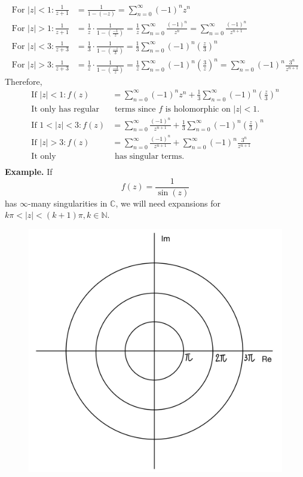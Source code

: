 \documentclass[11pt]{article}
\begin{document}
\begin{align*}
\mbox{For } |z| < 1: \frac{1}{z + 1} &= \frac{1}{1 - (-z)} = \sum_{n = 0}^{\infty} (-1)^nz^n\\
\mbox{For } |z| > 1: \frac{1}{z + 1} &= \frac{1}{z} \cdot \frac{1}{1 - \left(\frac{-1}{z}\right)} = \frac{1}{z} \sum_{n = 0}^{\infty}\frac{(-1)^n}{z^n} = \sum_{n = 0}^{\infty}\frac{(-1)^n}{z^{n + 1}}\\ 
\mbox{For } |z| < 3: \frac{1}{z + 3} &= \frac{1}{3} \cdot \frac{1}{1 - \left(\frac{-z}{3}\right)} = \frac{1}{3} \sum_{n = 0}^{\infty}(-1)^n\left(\frac{z}{3}\right)^n \\
\mbox{For } |z| > 3: \frac{1}{z + 3} &= \frac{1}{z} \cdot \frac{1}{1 - \left(\frac{-3}{z}\right)} = \frac{1}{z} \sum_{n = 0}^{\infty}(-1)^n\left(\frac{3}{z}\right)^n = \sum_{n = 0}^{\infty}(-1)^n\frac{3^n}{z^{n + 1}}
\end{align*}
Therefore, 
\begin{align*}
\mbox{If } |z| < 1: f(z) &= \sum_{n = 0}^{\infty}(-1)^nz^n + \frac{1}{3} \sum_{n = 0}^{\infty}(-1)^n\left(\frac{z}{3}\right)^n \\
\mbox{It only has regular} &\mbox{ terms since } f \mbox{ is holomorphic on } |z| < 1. \\
\mbox{If } 1 < |z| < 3: f(z) &= \sum_{n = 0}^{\infty} \frac{(-1)^n}{z^{n + 1}} + \frac{1}{3}\sum_{n = 0}^{\infty}(-1)^n\left(\frac{z}{3}\right)^n\\
\mbox{If } |z| > 3: f(z) &= \sum_{n = 0}^{\infty}\frac{(-1)^n}{z^{n + 1}} + \sum_{n = 0}^{\infty}(-1)^n\frac{3^n}{z^{n + 1}} \\
\mbox{It only} &\mbox{ has singular terms}. \\
\end{align*}
\newline
\textbf{Example.} If 
$$f(z) = \frac{1}{\sin(z)}$$ 
has $\infty$-many singularities in $\mathbb{C}$, we will need expansions for $k\pi < |z| < (k+1)\pi, k \in \mathbb{N}$. 
\begin{figure}[h]
\includegraphics[scale=0.2]{19_3} 
\centering
\end{figure}
\\
\newpage
\end{document}
